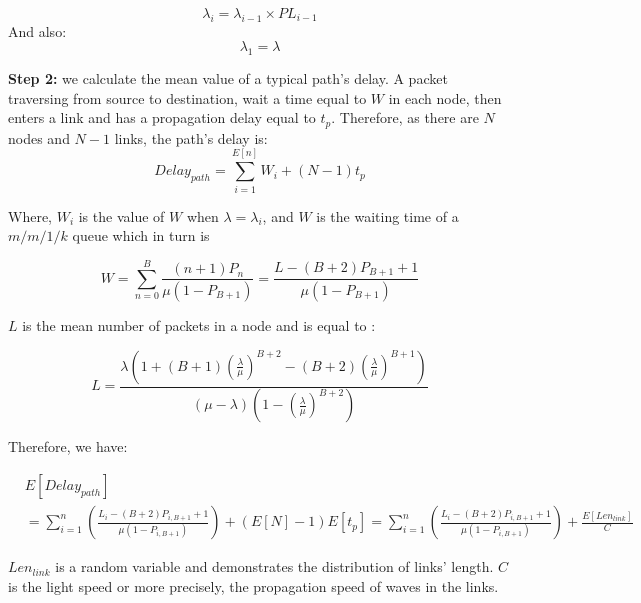 \documentclass[onecolumn,conference]{IEEEtran}
\begin{document}
    \begin{equation}
        \lambda_i=\lambda_{i-1} \times PL_{i-1}
    \end{equation}
    And also:
    \begin{equation}
        \lambda_1=\lambda
    \end{equation}

    \textbf{Step 2:} we calculate the mean value of a typical path's delay. A packet traversing from source to destination, wait a time equal to $W$ in each node, then enters a link and has a propagation delay equal to $t_p$. Therefore, as there are $N$ nodes and $N-1$ links, the path's delay is:
    \begin{equation}
        Delay_{path}=\sum_{i=1}^{E\left[n\right]}W_i+\left(N-1\right)t_p
    \end{equation}

    Where, $W_i$ is the value of $W$ when $\lambda=\lambda_i$, and $W$ is the waiting time of a $m/m/1/k$ queue which in turn is \cite{b4}

    \begin{equation}
        W=\sum_{n=0}^B\frac{\left(n+1\right)P_n}
        {\mu\left(1-P_{B+1}\right)}=\frac{L-\left(B+2\right)P_{B+1}+1}{\mu\left(1-P_{B+1}\right)}
    \end{equation}

    $L$ is the mean number of packets in a node and is equal to \cite{b4}:

    \begin{equation}
        L=\frac{\lambda\left(1+\left(B+1\right)\left(\frac{\lambda}{\mu}\right)^{B+2}-\left(B+2\right)\left(\frac{\lambda}{\mu}\right)^{B+1}\right)}{\left(\mu-\lambda\right)\left(1-\left(\frac{\lambda}{\mu}\right)^{B+2}\right)}
    \end{equation}

    Therefore, we have:

    \begin{equation}
        \begin{split}
            &E\left[Delay_{path}\right]\\&=\sum_{i=1}^n\left(\frac{L_i-\left(B+2\right)P_{i,B+1}+1}{\mu\left(1-P_{i,B+1}\right)}\right)+\left(E\left[N\right]-1\right)E\left[t_p\right]=\sum_{i=1}^n\left(\frac{L_i-\left(B+2\right)P_{i,B+1}+1}{\mu\left(1-P_{i,B+1}\right)}\right)+\frac{E\left[Len_{link}\right]}{C}
        \end{split}
    \end{equation}

    $Len_{link}$ is a random variable and demonstrates the distribution of links' length. $C$ is the light speed or more precisely, the propagation speed of waves in the links.
\end{document}
